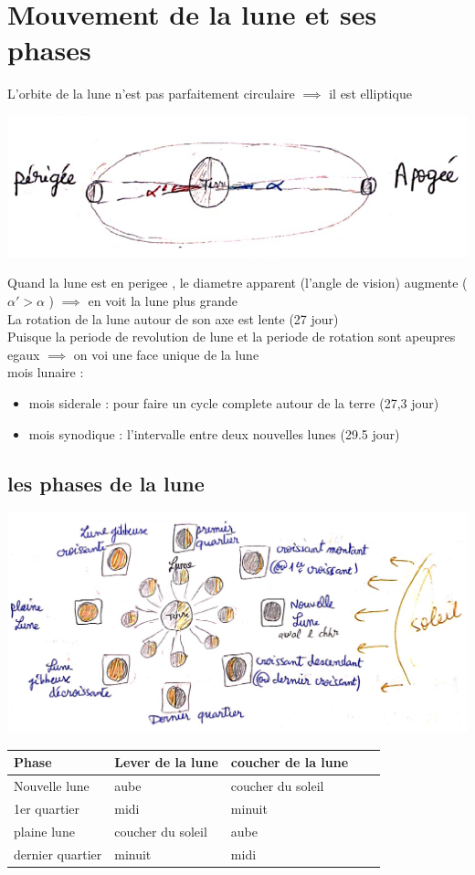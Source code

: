 \documentclass[12pt]{book}
\begin{document}
    \chapter{Mouvement de la lune et ses phases}
        L'orbite de la lune n'est pas parfaitement circulaire $ \implies $ il est elliptique
        \begin{center}
            \includegraphics[width=0.5\linewidth]{pic/mouvementlune.png}
        \end{center}
        Quand la lune est en perigee , le diametre apparent (l'angle de vision) augmente ($ \alpha' > \alpha $ ) $ \implies $ en voit la lune plus grande \\
        La rotation de la lune autour de son axe est lente (27 jour) \\
        Puisque la periode de revolution de lune et la periode de rotation sont apeupres egaux $ \implies $ on voi une face unique de la lune \\
        mois lunaire :
        \begin{itemize}
            \item mois siderale : pour faire un cycle complete autour de la terre (27,3 jour)
            \item mois synodique : l'intervalle entre deux nouvelles lunes (29.5 jour)
        \end{itemize} 
        \section{les phases de la lune}
            \begin{center}
                \includegraphics[width=0.7\linewidth]{pic/lunephase.png}
                    \begin{tabular}{|l|l|l|l|l|}
                    \hline
                     Phase &  Lever de la lune & coucher de la lune    \\ \hline
                     Nouvelle lune& aube  &   coucher du soleil \\ \hline
                     1er quartier& midi &    minuit\\ \hline
                     plaine lune& coucher du soleil & aube    \\ \hline
                     dernier quartier&  minuit& midi    \\ \hline
                    \end{tabular}
            \end{center}


        
        
\end{document}
